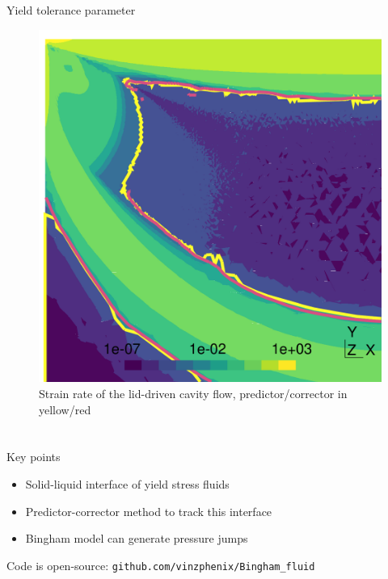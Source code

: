 \documentclass{beamer}  %
\begin{document}
\begin{frame}{Yield tolerance parameter}
    \begin{figure}
        \centering
        \includegraphics[height=0.65\textheight]{../figures/correction_1.pdf}
        \caption*{Strain rate of the lid-driven cavity flow, predictor/corrector in yellow/red}
    \end{figure}
\end{frame}

\section*{}
\begin{frame}{Key points}
    \begin{itemize}
        \setlength{\itemsep}{12pt}
        \item Solid-liquid interface of yield stress fluids
        \item Predictor-corrector method to track this interface
        \item Bingham model can generate pressure jumps
    \end{itemize}
    \vspace{48pt}
    Code is open-source: \texttt{github.com/vinzphenix/Bingham\_fluid}
\end{frame}
\end{document}
